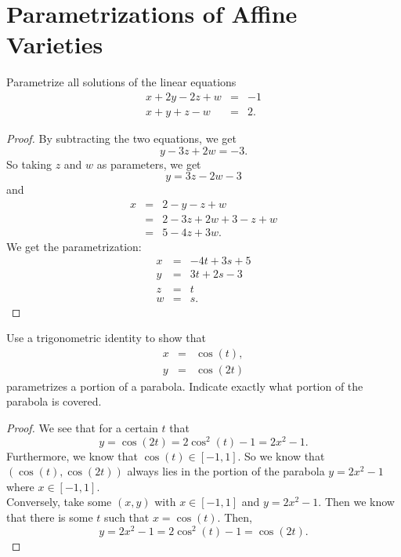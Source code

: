 \section{Parametrizations of Affine Varieties}


\begin{exercise}{1}
Parametrize all solutions of the linear equations
\begin{eqnarray*}
    x + 2y - 2z + w & = & -1\\
    x + y + z - w & = & 2.
\end{eqnarray*}
\end{exercise}
\begin{proof}
    By subtracting the two equations, we get
    $$y - 3z + 2w = -3.$$
    So taking $z$ and $w$ as parameters, we get
    $$y = 3z - 2w - 3$$
    and
    \begin{eqnarray*}
        x
        & = & 2 - y - z +w\\
        & = & 2 -3z +2w + 3 -z + w\\
        & = & 5 - 4z + 3w.
    \end{eqnarray*}
    We get the parametrization:
    \begin{eqnarray*}
        x & = & -4t + 3s + 5\\
        y & = & 3t + 2s - 3\\
        z & = & t\\
        w & = & s.
    \end{eqnarray*}
\end{proof}

\begin{exercise}{2}
    Use a trigonometric identity to show that
    \begin{eqnarray*}
        x & = & \cos(t),\\
        y & = & \cos(2t)
    \end{eqnarray*}
    parametrizes a portion of a parabola. Indicate exactly what portion of the parabola is covered.
\end{exercise}
\begin{proof}
    We see that for a certain $t$ that
    $$y = \cos(2t) = 2\cos^2(t) - 1 = 2x^2 - 1.$$
    Furthermore, we know that $\cos(t)\in [-1,1]$. So we know that $(\cos(t), \cos(2t))$ always lies in the portion of the parabola $y = 2x^2 -1$ where $x\in [-1,1]$.\\
    Conversely, take some $(x,y)$ with $x\in [-1,1]$ and $y = 2x^2 - 1$. Then we know that there is some $t$ such that $x=\cos(t)$. Then,
    $$y = 2x^2 - 1 = 2\cos^2(t) - 1 = \cos(2t).$$
\end{proof}

